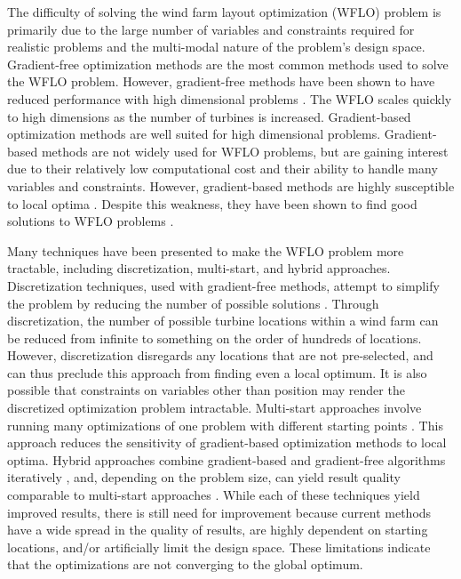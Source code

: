 \documentclass[a4paper]{jpconf}
\begin{document}
The difficulty of solving the wind farm layout optimization (WFLO) problem is primarily due to the large number of variables and constraints required for realistic problems and the multi-modal nature of the problem's design space. Gradient-free optimization methods are the most common methods used to solve the WFLO problem. However, gradient-free methods have been shown to have reduced performance with high dimensional problems \cite{rios2013-grad-free-comparison}. The WFLO scales quickly to high dimensions as the number of turbines is increased. Gradient-based optimization methods are well suited for high dimensional problems. Gradient-based methods are not widely used for WFLO problems, but are gaining interest due to their relatively low computational cost and their ability to handle many variables and constraints. However, gradient-based methods are highly susceptible to local optima \cite{acero2014}. Despite this weakness, they have been shown to find good solutions to WFLO problems \cite{fleming2015, guirguis2016, gebraad2017-Maximization-Annual}.  

Many techniques have been presented to make the WFLO problem more tractable, including discretization, multi-start, and hybrid approaches. Discretization techniques, used with gradient-free methods, attempt to simplify the problem by reducing the number of possible solutions \cite{mosetti1994, grady2005}. Through discretization, the number of possible turbine locations within a wind farm can be reduced from infinite to something on the order of hundreds of locations. However, discretization disregards any locations that are not pre-selected, and can thus preclude this approach from finding even a local optimum. It is also possible that constraints on variables other than position may render the discretized optimization problem intractable. Multi-start approaches involve running many optimizations of one problem with different starting points \cite{gonzalez2014}. This approach reduces the sensitivity of gradient-based optimization methods to local optima. Hybrid approaches combine gradient-based and gradient-free algorithms iteratively \cite{rethore2014,graf2016, mittal2017}, %
and, depending on the problem size, can yield result quality comparable to multi-start approaches \cite{rethore2014}. While each of these techniques yield improved results, there is still need for improvement because current methods have a wide spread in the quality of results, are highly dependent on starting locations, and/or artificially limit the design space. These limitations indicate that the optimizations are not converging to the global optimum.
\end{document}
